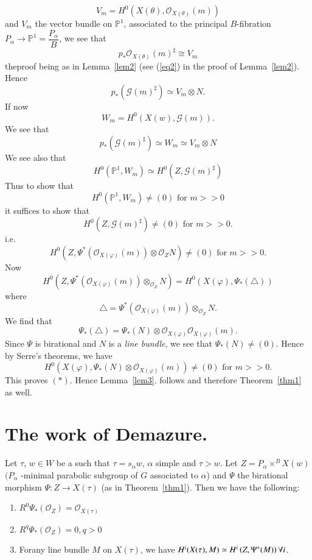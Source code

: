 \begin{Proof}
$$
V_m=H^{0}(X(\theta), \mathscr{O}_{X(\theta)}(m))
$$
and $V_m$ the vector bundle on $\mathbb{P}^{1}$, associated to the principal $B$-fibration $P_{\alpha}\to \mathbb{P}^{1}=\dfrac{P_{\alpha}}{B}$, we see that 
$$
p_{\ast}\mathscr{O}_{X(\theta)}(m)^{\sharp}\cong V_m
$$
the\pageoriginale proof being as in Lemma~\ref{lem2} (see (\ref{eq2}) in the proof of Lemma~\ref{lem2}). Hence 
$$
p_{\ast}\left(\mathscr{G}(m)^{\sharp}\right)\simeq V_m\otimes N.
$$
If now 
$$
W_m=H^{0}(X(w),\mathscr{G}(m)). 
$$
We see that 
$$
p_{\ast}\left(\mathscr{G}(m)^{\sharp}\right)\simeq W_m\simeq V_m\otimes N 
$$
We see also that 
$$
H^{0}\left(\mathbb{P}^{1}, W_m\right)\simeq H^{0}\left(Z,\mathscr{G}(m)^{\sharp}\right)
$$
Thus to show that 
$$
H^{0}\left(\mathbb{P}^{1}, W_m\right)\neq (0) \text{ for } m>>0
$$
it suffices to show that 
$$
H^{0}\left(Z,\mathscr{G}(m)^{\sharp}\right)\neq (0) \text{  for } m>>0. 
$$
i.e.
$$
H^{0}\left(Z, \Psi^{\ast}\left(\mathscr{O}_{X(\varphi)}(m)\right)\otimes \mathscr{O}_Z N\right) \neq (0) \text{ for }m >> 0. 
$$
Now\pageoriginale 
$$
H^{0}\left(Z, \Psi^{\ast}\left(\mathscr{O}_{X(\varphi)}(m)\right)\otimes_{\mathscr{O}_Z}N\right)=H^{0}(X(\varphi), \Psi_{\ast}(\triangle))
$$
where
$$
\triangle=\Psi^{\ast}\left(\mathscr{O}_{X(\varphi)}(m)\right)\otimes_{\mathscr{O}_Z}N. 
$$
We find that 
$$
\Psi_{\ast}(\triangle)=\Psi_{\ast}(N)\otimes \mathscr{O}_{X(\varphi)}\mathscr{O}_{X(\varphi)}(m). 
$$
Since $\Psi$ is birational and $N$ is a \textit{line bundle}, we see that $\Psi_{\ast}(N)\neq (0)$. Hence by Serre's theorems, we have 
$$
H^{0}(X(\varphi), \Psi_{\ast}(N)\otimes \mathscr{O}_{X(\varphi)}(m))\neq (0)\text{ for } m>> 0. 
$$
This proves $(\ast)$. Hence Lemma~\ref{lem3}. follows and therefore Theorem~\ref{thm1} as well. 
\end{Proof}

\section{The work of Demazure.}\label{s3}


\begin{Prop}\label{Prop1}
Let $\tau$, $w\in W$ be a such that $\tau=s_{\alpha} w$, $\alpha$ simple and $\tau> w$. Let $Z=P_{\alpha} \times ^{B} X(w)$ $(P_{\alpha}$ -minimal parabolic subgroup of $G$ associated to $\alpha$) and $\Psi$ the birational morphism $\Psi:Z\to X(\tau)$ (as in Theorem~\ref{thm1}). Then we have the following: 
\begin{enumerate}
\renewcommand{\theenumi}{\roman{enumi}}
\renewcommand{\labelenumi}{(\theenumi)}
\item $R^{0}\Psi_{\ast}\left(\mathscr{O}_Z\right)=\mathscr{O}_{X(\tau)}$
\item $R^{q}\Psi_{\ast}\left(\mathscr{O}_Z\right)=0, q>0$
\item For\pageoriginale any line bundle $M$ on $X(\tau)$, we have $H^{i}(X(\tau), M)\simeq H^{i}\\\left(Z,\Psi^{\ast}(M)\right)\forall i$. 
\end{enumerate}
\end{Prop}

